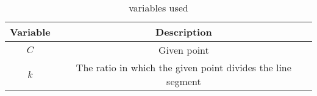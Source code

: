 \begin{table}[h]
    \centering
    \begin{tabular}{|c|c|}
        \hline
        Variable & Description \\
        \hline
        $C$ & Given point\\
        \hline
        $k$ & The ratio in which the given point divides the line segment\\
        \hline
    \end{tabular}
    \caption{variables used}
    \label{tab:my_label}
\end{table}
